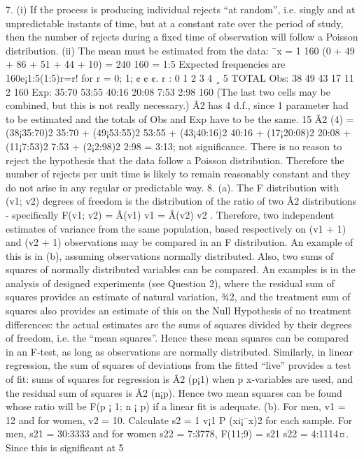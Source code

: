 7. (i) If the process is producing individual rejects “at random”, i.e. singly and
at unpredictable instants of time, but at a constant rate over the period
of study, then the number of rejects during a fixed time of observation will
follow a Poisson distribution.
(ii) The mean must be estimated from the data:
¯x =
1
160
(0 + 49 + 86 + 51 + 44 + 10) =
240
160
= 1:5
Expected frequencies are 160e¡1:5(1:5)r=r! for r = 0; 1; ¢ ¢ ¢.
r : 0 1 2 3 4 ¸ 5 TOTAL
Obs: 38 49 43 17 11 2 160
Exp: 35:70 53:55 40:16 20:08 7:53 2:98 160
(The last two cells may be combined, but this is not really necessary.)
Â2 has 4 d.f., since 1 parameter had to be estimated and the totals of Obs
and Exp have to be the same.
15
Â2
(4) = (38¡35:70)2
35:70 + (49¡53:55)2
53:55 + (43¡40:16)2
40:16 + (17¡20:08)2
20:08 + (11¡7:53)2
7:53 + (2¡2:98)2
2:98
= 3:13; not significance.
There is no reason to reject the hypothesis that the data follow a Poisson
distribution. Therefore the number of rejects per unit time is likely to remain
reasonably constant and they do not arise in any regular or predictable way.
8. (a). The F distribution with (v1; v2) degrees of freedom is the distribution of the
ratio of two Â2 distributions - specifically F(v1; v2) = Â(v1)
v1
=
Â(v2)
v2
. Therefore,
two independent estimates of variance from the same population, based respectively
on (v1 + 1) and (v2 + 1) observations may be compared in an F
distribution. An example of this is in (b), assuming observations normally
distributed.
Also, two sums of squares of normally distributed variables can be compared.
An examples is in the analysis of designed experiments (see Question
2), where the residual sum of squares provides an estimate of natural variation,
¾2, and the treatment sum of squares also provides an estimate of
this on the Null Hypothesis of no treatment differences: the actual estimates
are the sums of squares divided by their degrees of freedom, i.e. the “mean
squares”. Hence these mean squares can be compared in an F-test, as long
as observations are normally distributed.
Similarly, in linear regression, the sum of squares of deviations from the fitted
“live” provides a test of fit: sums of squares for regression is Â2
(p¡1) when
p x-variables are used, and the residual sum of squares is Â2
(n¡p). Hence two
mean squares can be found whose ratio will be F(p ¡ 1; n ¡ p) if a linear fit
is adequate.
(b). For men, v1 = 12 and for women, v2 = 10. Calculate s2 = 1
v¡1
P
(xi¡¯x)2 for
each sample. For men, s21
= 30:3333 and for women s22
= 7:3778, F(11;9) =
s21
s22
= 4:1114¤. Since this is significant at 5%
